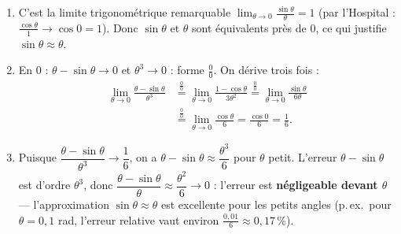 \documentclass[11pt,a4paper]{article}
\begin{document}
\begin{correction}
\begin{enumerate}[label=\alph*),leftmargin=2em,itemsep=3pt]
  \item C'est la limite trigonométrique remarquable $\displaystyle\lim_{\theta\to 0}\frac{\sin\theta}{\theta}=1$
        (par l'Hospital : $\frac{\cos\theta}{1}\to\cos 0=1$). Donc $\sin\theta$ et $\theta$ sont
        équivalents près de $0$, ce qui justifie $\sin\theta\approx\theta$.
  \item En $0$ : $\theta-\sin\theta\to 0$ et $\theta^3\to 0$ : forme $\frac00$. On dérive trois fois :
        \begin{align*}
        \lim_{\theta\to 0}\frac{\theta-\sin\theta}{\theta^3}
        &\overset{\frac00}{=}\lim_{\theta\to 0}\frac{1-\cos\theta}{3\theta^2}
         \overset{\frac00}{=}\lim_{\theta\to 0}\frac{\sin\theta}{6\theta}\\
        &\overset{\frac00}{=}\lim_{\theta\to 0}\frac{\cos\theta}{6}=\frac{\cos 0}{6}=\frac16.
        \end{align*}
  \item Puisque $\dfrac{\theta-\sin\theta}{\theta^3}\to\dfrac16$, on a $\theta-\sin\theta\approx\dfrac{\theta^3}{6}$
        pour $\theta$ petit. L'erreur $\theta-\sin\theta$ est d'ordre $\theta^3$, donc
        $\dfrac{\theta-\sin\theta}{\theta}\approx\dfrac{\theta^2}{6}\to 0$ : l'erreur est \textbf{négligeable
        devant $\theta$} — l'approximation $\sin\theta\approx\theta$ est excellente pour les petits angles
        (p.\,ex.\ pour $\theta=0{,}1$ rad, l'erreur relative vaut environ $\frac{0{,}01}{6}\approx 0{,}17\,\%$).
\end{enumerate}
\end{correction}
\end{document}
